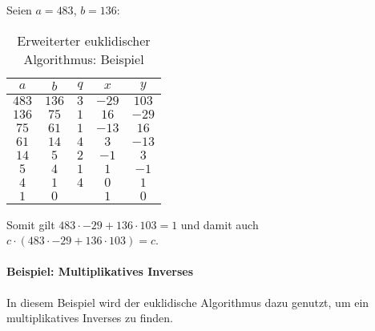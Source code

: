 				Seien \( a = 483 \), \( b = 136 \):
				\begin{table}[H]
					\centering
					\begin{tabular}{|c|c|c|c|c|}
						\hline
						\(a\)             & \(b\)   & \(q\) & \(x\)               & \(y\)               \\ \hline
						\(483\)           & \(136\) & \(3\) & \underline{\(-29\)} & \underline{\(103\)} \\ \hline
						\(136\)           & \(75\)  & \(1\) & \(16\)              & \(-29\)             \\ \hline
						\(75\)            & \(61\)  & \(1\) & \(-13\)             & \(16\)              \\ \hline
						\(61\)            & \(14\)  & \(4\) & \(3\)               & \(-13\)             \\ \hline
						\(14\)            & \(5\)   & \(2\) & \(-1\)              & \(3\)               \\ \hline
						\(5\)             & \(4\)   & \(1\) & \(1\)               & \(-1\)              \\ \hline
						\(4\)             & \(1\)   & \(4\) & \(0\)               & \(1\)               \\ \hline
						\underline{\(1\)} & \(0\)   & \(\)  & \(1\)               & \(0\)               \\ \hline
					\end{tabular}
					\caption{Erweiterter euklidischer Algorithmus: Beispiel}
				\end{table}
				Somit gilt \( 483 \cdot -29 + 136 \cdot 103 = 1 \) und damit auch \( c \cdot (483 \cdot -29 + 136 \cdot 103) = c \).

			\paragraph{Beispiel: Multiplikatives Inverses}
				In diesem Beispiel wird der euklidische Algorithmus dazu genutzt, um ein multiplikatives Inverses zu finden.

